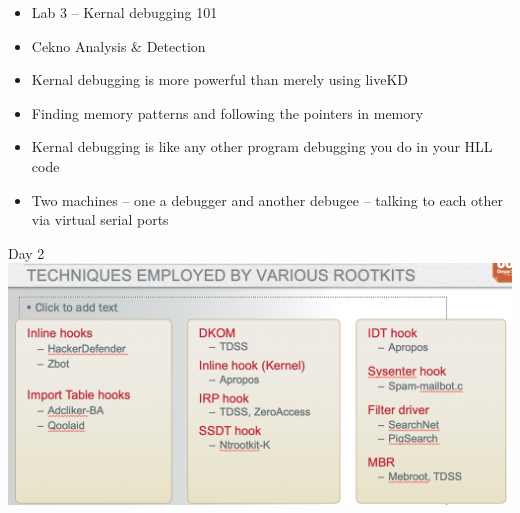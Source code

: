 \documentclass[12pt]{article}
\begin{document}
\begin{itemize}
\item Lab 3 – Kernal debugging 101
\item Cekno Analysis & Detection
\item Kernal debugging is more powerful than merely using liveKD
\item Finding memory patterns and following the pointers in memory
\item Kernal debugging is like any other program debugging you do in your HLL code
\item Two machines – one a debugger and another debugee – talking to each other via virtual serial ports
\end{itemize}

\newline
Day 2
\includegraphics{7.png}
\end{document}
